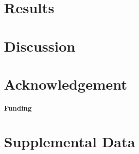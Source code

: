 \documentclass{frontiersSCNS} %
\begin{document}
\section{Results}


\section{Discussion}


\section*{Acknowledgement}


\paragraph{Funding\textcolon}

\section*{Supplemental Data}



\end{document}

